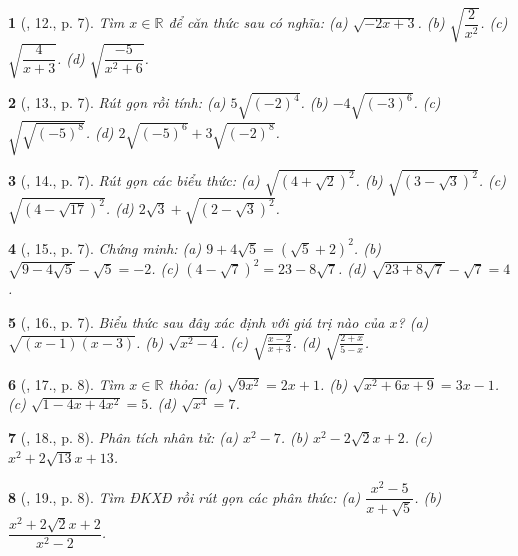 \documentclass{article}
\newtheorem{baitoan}{}
\begin{document}
\begin{baitoan}[\cite{SBT_Toan_9_tap_1}, 12., p. 7]
	Tìm $x\in\mathbb{R}$ để căn thức sau có nghĩa: (a) $\sqrt{-2x + 3}$. (b) $\sqrt{\dfrac{2}{x^2}}$. (c) $\sqrt{\dfrac{4}{x + 3}}$. (d) $\sqrt{\dfrac{-5}{x^2 + 6}}$.
\end{baitoan}

\begin{baitoan}[\cite{SBT_Toan_9_tap_1}, 13., p. 7]
	Rút gọn rồi tính: (a) $5\sqrt{(-2)^4}$. (b) $-4\sqrt{(-3)^6}$. (c) $\sqrt{\sqrt{(-5)^8}}$. (d) $2\sqrt{(-5)^6} + 3\sqrt{(-2)^8}$.
\end{baitoan}

\begin{baitoan}[\cite{SBT_Toan_9_tap_1}, 14., p. 7]
	Rút gọn các biểu thức: (a) $\sqrt{(4 + \sqrt{2})^2}$. (b) $\sqrt{(3 - \sqrt{3})^2}$. (c) $\sqrt{(4 - \sqrt{17})^2}$. (d) $2\sqrt{3} + \sqrt{(2 - \sqrt{3})^2}$.
\end{baitoan}

\begin{baitoan}[\cite{SBT_Toan_9_tap_1}, 15., p. 7]
	Chứng minh: (a) $9 + 4\sqrt{5} = (\sqrt{5} + 2)^2$. (b) $\sqrt{9 - 4\sqrt{5}} - \sqrt{5} = -2$. (c) $(4 - \sqrt{7})^2 = 23 - 8\sqrt{7}$. (d) $\sqrt{23 + 8\sqrt{7}} - \sqrt{7} = 4$.
\end{baitoan}

\begin{baitoan}[\cite{SBT_Toan_9_tap_1}, 16., p. 7]
	Biểu thức sau đây xác định với giá trị nào của $x$? (a) $\sqrt{(x - 1)(x - 3)}$. (b) $\sqrt{x^2 - 4}$. (c) $\sqrt{\frac{x - 2}{x + 3}}$. (d) $\sqrt{\frac{2 + x}{5 - x}}$.
\end{baitoan}

\begin{baitoan}[\cite{SBT_Toan_9_tap_1}, 17., p. 8]
	Tìm $x\in\mathbb{R}$ thỏa: (a) $\sqrt{9x^2} = 2x + 1$. (b) $\sqrt{x^2 + 6x + 9} = 3x - 1$. (c) $\sqrt{1 - 4x + 4x^2} = 5$. (d) $\sqrt{x^4} = 7$.
\end{baitoan}

\begin{baitoan}[\cite{SBT_Toan_9_tap_1}, 18., p. 8]
	Phân tích nhân tử: (a) $x^2 - 7$. (b) $x^2  - 2\sqrt{2}x + 2$. (c) $x^2 + 2\sqrt{13}x + 13$.
\end{baitoan}

\begin{baitoan}[\cite{SBT_Toan_9_tap_1}, 19., p. 8]
	Tìm ĐKXĐ rồi rút gọn các phân thức: (a) $\dfrac{x^2 - 5}{x + \sqrt{5}}$. (b) $\dfrac{x^2 + 2\sqrt{2}x + 2}{x^2 - 2}$.
\end{baitoan}
\end{document}
